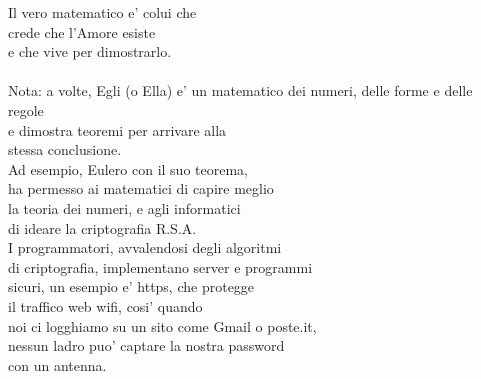 \begin{haiku}
Il vero matematico e' colui che\\
crede che l'Amore esiste\\
e che vive per dimostrarlo.\\
\leavevmode\\
Nota: a volte, Egli (o Ella) e' un
matematico dei numeri, delle forme e delle regole\\
e dimostra teoremi per arrivare alla\\
stessa conclusione.\\
Ad esempio, Eulero con il suo teorema,\\
ha permesso ai matematici di capire meglio\\
la teoria dei numeri, e agli informatici\\
di ideare la criptografia R.S.A.\\
I programmatori, avvalendosi degli algoritmi\\
di criptografia, implementano server e programmi\\
sicuri, un esempio e' https, che protegge\\
il traffico web wifi, cosi' quando\\
noi ci logghiamo su un sito come Gmail o poste.it,\\
nessun ladro puo' captare la nostra password\\
con un antenna.\\
\end{haiku}

